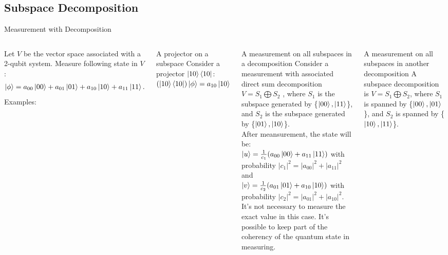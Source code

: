 \documentclass{beamer}
\begin{document}
\subsection{Subspace Decomposition}
\begin{frame}{Measurement with Decomposition}
  {\tiny
    \begin{columns}
    Let $V$ be the vector space associated with a 2-qubit system. Measure following state in $V$:
    \begin{align*}
      \ket{\phi} = a_{00}\ket{00} + a_{01}\ket{01} + a_{10}\ket{10} + a_{11}\ket{11}.
    \end{align*}
    Examples:
    \begin{block}{A projector on a subspace}
      Consider a projector $\ket{10}\bra{10}$: \\
      $(\ket{10}\bra{10}) \ket{\phi} = a_{10}\ket{10}$
    \end{block}
    \begin{block}{A measurement on all subspaces in a decomposition}
      Consider a measurement with associated direct sum decomposition $V = S_1 \bigoplus S_2$ , where $S_1$ is the subspace generated by \{$\ket{00}, \ket{11}$\},
      and $S_2$ is the subspace generated by \{$\ket{01}, \ket{10}$\}. \\
      After meansurement, the state will be:\\
      $\ket{u} = \frac{1}{c_1}(a_{00}\ket{00} + a_{11}\ket{11})$ with probability $|c_1|^2 = |a_{00}|^2 + |a_{11}|^2$ and \\
      $\ket{v} = \frac{1}{c_2}(a_{01}\ket{01} + a_{10}\ket{10})$ with probability $|c_2|^2 = |a_{01}|^2 + |a_{10}|^2$. \\
      It's not necessary to measure the exact value in this case. It's possible to keep part of the coherency of the quantum state in measuring.
    \end{block}
    \begin{block}{A measurement on all subspaces in another decomposition}
      A subspace decomposition is $V = S_1 \bigoplus S_2$, where $S_1$ is spanned by \{$\ket{00}, \ket{01}$\},
      and $S_2$ is spanned by \{$\ket{10}, \ket{11}$\}.
    \end{block}
    \end{columns}
  }%
\end{frame}
\end{document}
